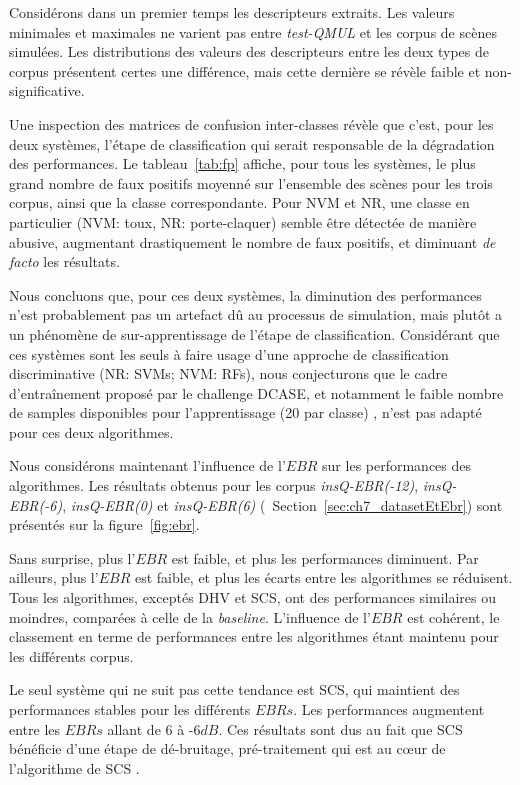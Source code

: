 Considérons dans un premier temps les descripteurs extraits. Les valeurs minimales et maximales ne varient pas entre \emph{test-QMUL} et les corpus de scènes simulées. Les distributions des valeurs des descripteurs entre les deux types de corpus présentent certes une différence, mais cette dernière se révèle faible et non-significative.  

Une inspection des matrices de confusion inter-classes révèle que c'est, pour les deux systèmes, l'étape de classification qui serait responsable de la dégradation des performances. Le tableau~\ref{tab:fp} affiche, pour tous les systèmes, le plus grand nombre de faux positifs moyenné  sur l'ensemble des scènes pour les trois corpus, ainsi que la classe correspondante. Pour NVM et NR, une classe en particulier (NVM: toux, NR: porte-claquer) semble être détectée de manière abusive, augmentant drastiquement le nombre de faux positifs, et diminuant \emph{de facto} les résultats.

Nous concluons que, pour ces deux systèmes, la diminution des performances n'est probablement pas un artefact dû au processus de simulation, mais plutôt a un phénomène de sur-apprentissage de l'étape de classification. Considérant que ces systèmes sont les seuls à faire usage d'une approche de classification discriminative (NR: SVMs; NVM: RFs), nous conjecturons que le cadre d'entraînement proposé par le challenge DCASE, et notamment le faible nombre de samples disponibles pour l'apprentissage (20 par classe) , n'est pas adapté pour ces deux algorithmes.

Nous considérons maintenant l'influence de l'$EBR$ sur les performances des algorithmes. Les résultats obtenus pour les corpus \emph{insQ-EBR(-12)}, \emph{insQ-EBR(-6)}, \emph{insQ-EBR(0)} et \emph{insQ-EBR(6)} (\cf~Section~\ref{sec:ch7_datasetEtEbr}) sont présentés sur la figure~\ref{fig:ebr}. 

Sans surprise, plus l'$EBR$ est faible, et plus les performances diminuent. Par ailleurs, plus l'$EBR$ est faible, et plus les écarts entre les algorithmes se réduisent. Tous les algorithmes, exceptés DHV et SCS, ont des performances similaires ou moindres, comparées à celle  de la \emph{baseline}. L'influence de l'$EBR$ est cohérent, le classement en terme de performances entre les algorithmes étant maintenu pour les différents corpus. 

Le seul système qui ne suit pas cette tendance est SCS, qui maintient des performances stables pour les différents $EBRs$. Les performances augmentent entre les $EBRs$ allant de 6 à -6$dB$. Ces résultats sont dus au fait que SCS bénéficie d'une étape de dé-bruitage, pré-traitement qui est au cœur de l'algorithme de SCS \citep{SCS}.

